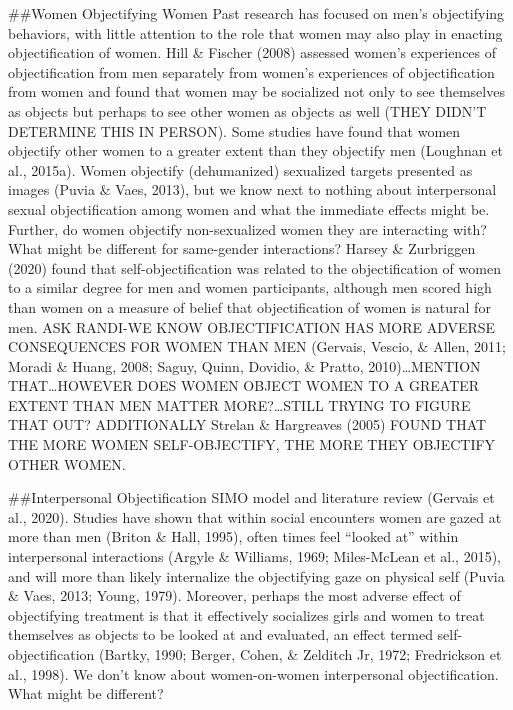 \documentclass[
  man]{apa6}
\begin{document}
\#\#Women Objectifying Women
Past research has focused on men's objectifying behaviors, with little attention to the role that women may also play in enacting objectification of women. Hill \& Fischer (2008) assessed women's experiences of objectification from men separately from women's experiences of objectification from women and found that women may be socialized not only to see themselves as objects but perhaps to see other women as objects as well (THEY DIDN'T DETERMINE THIS IN PERSON).
Some studies have found that women objectify other women to a greater extent than they objectify men (Loughnan et al., 2015a). Women objectify (dehumanized) sexualized targets presented as images (Puvia \& Vaes, 2013), but we know next to nothing about interpersonal sexual objectification among women and what the immediate effects might be. Further, do women objectify non-sexualized women they are interacting with? What might be different for same-gender interactions? Harsey \& Zurbriggen (2020) found that self-objectification was related to the objectification of women to a similar degree for men and women participants, although men scored high than women on a measure of belief that objectification of women is natural for men. ASK RANDI-WE KNOW OBJECTIFICATION HAS MORE ADVERSE CONSEQUENCES FOR WOMEN THAN MEN (Gervais, Vescio, \& Allen, 2011; Moradi \& Huang, 2008; Saguy, Quinn, Dovidio, \& Pratto, 2010)\ldots MENTION THAT\ldots HOWEVER DOES WOMEN OBJECT WOMEN TO A GREATER EXTENT THAN MEN MATTER MORE?\ldots STILL TRYING TO FIGURE THAT OUT? ADDITIONALLY Strelan \& Hargreaves (2005) FOUND THAT THE MORE WOMEN SELF-OBJECTIFY, THE MORE THEY OBJECTIFY OTHER WOMEN.

\#\#Interpersonal Objectification
SIMO model and literature review (Gervais et al., 2020). Studies have shown that within social encounters women are gazed at more than men (Briton \& Hall, 1995), often times feel \enquote{looked at} within interpersonal interactions (Argyle \& Williams, 1969; Miles-McLean et al., 2015), and will more than likely internalize the objectifying gaze on physical self (Puvia \& Vaes, 2013; Young, 1979). Moreover, perhaps the most adverse effect of objectifying treatment is that it effectively socializes girls and women to treat themselves as objects to be looked at and evaluated, an effect termed self-objectification (Bartky, 1990; Berger, Cohen, \& Zelditch Jr, 1972; Fredrickson et al., 1998). We don't know about women-on-women interpersonal objectification. What might be different?
\end{document}
